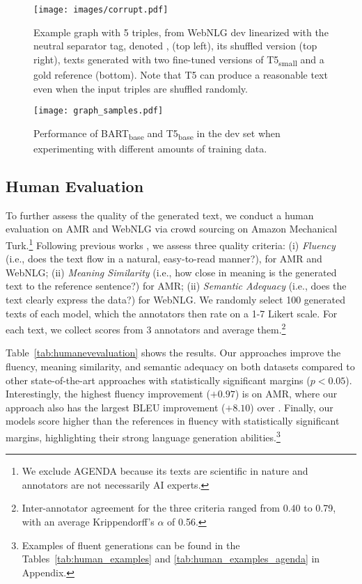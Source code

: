 \documentclass[11pt]{article}
\makeatletter
\newcommand*{\bigcdot}{}\DeclareRobustCommand*{\bigcdot}{\mathbin{\mathpalette\bigcdot@{}}}
\newcommand*{\bigcdot@scalefactor}{.65}
\newcommand*{\bigcdot@widthfactor}{1.15}
\newcommand*{\bigcdot@}[2]{\sbox0{$#1\vcenter{}$}\sbox2{$#1\cdot\m@th$}\hbox to \bigcdot@widthfactor\wd2{\hfil
    \raise\ht0\hbox{\scalebox{\bigcdot@scalefactor}{\lower\ht0\hbox{$#1\bullet\m@th$}}}\hfil
  }}
\newcommand{\sep}{$\bigcdot$}
\makeatother
\begin{document}
 \begin{figure*}[t]
    \centering
    \texttt{[image: images/corrupt.pdf]}
    \caption{Example graph with 5 triples, from WebNLG dev linearized with the neutral separator tag, denoted \sep{}, (top left), its shuffled version (top right), texts generated with two fine-tuned versions of T5\textsubscript{small} and a gold reference (bottom). Note that T5 can produce a reasonable text even when the input triples are shuffled randomly.}
    \label{fig:graphs-shuffle}
\end{figure*}

 \begin{figure}[t]
    \centering
    \texttt{[image: graph\_samples.pdf]}
    \caption{Performance of BART\textsubscript{base} and T5\textsubscript{base} in the dev set when experimenting with different amounts of training data.}
    \label{fig:graphs-trainingexamples}
    \vspace{-3mm}
\end{figure}

\subsection{Human Evaluation}
\label{sec:human_eval}
To further assess the quality of the generated text, we conduct a human evaluation on AMR and WebNLG via crowd sourcing on Amazon Mechanical Turk.\footnote{We exclude AGENDA because its texts are scientific in nature and annotators are not necessarily AI experts.} Following previous works \cite{gardent-etal-2017-webnlg, castro-ferreira-etal-2019-neural}, we assess three quality criteria: (i) \emph{Fluency} (i.e., does the text flow in a natural, easy-to-read manner?), for AMR and WebNLG; (ii) \emph{Meaning Similarity} (i.e., how close in meaning is
the generated text to the reference sentence?) for AMR; (ii) \emph{Semantic Adequacy} (i.e., does the text clearly express the data?) for WebNLG. We randomly select 100 generated texts of each model, which the annotators then rate on a 1-7 Likert scale. For each text, we collect scores from 3 annotators and average them.\footnote{Inter-annotator agreement for the three criteria ranged from 0.40 to 0.79, with an average Krippendorff's $\alpha$ of 0.56.} 


Table~\ref{tab:humanevevaluation} shows the results.  Our approaches improve the fluency, meaning similarity, and semantic adequacy on both datasets compared to other state-of-the-art approaches with statistically significant margins ($p{<}0.05$). Interestingly, the highest fluency improvement ($+0.97$) is on AMR, where our approach also has the largest BLEU improvement ($+8.10$) over \citet{harkous2020text}. Finally, our models score higher than the references in fluency with statistically significant margins, highlighting their strong language generation abilities.\footnote{Examples of fluent generations can be found in the Tables~\ref{tab:human_examples} and \ref{tab:human_examples_agenda} in Appendix.}
\end{document}

